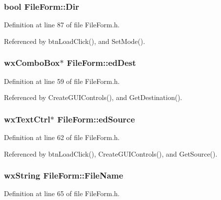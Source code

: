 \subsubsection{\setlength{\rightskip}{0pt plus 5cm}bool {\bf File\-Form::Dir}\hspace{0.3cm}{\tt  [private]}}\label{class_file_form_a6750126e221ecaa6f1b9fc74b459cdb}




Definition at line 87 of file File\-Form.h.

Referenced by btn\-Load\-Click(), and Set\-Mode().
\subsubsection{\setlength{\rightskip}{0pt plus 5cm}wx\-Combo\-Box$\ast$ {\bf File\-Form::ed\-Dest}\hspace{0.3cm}{\tt  [private]}}\label{class_file_form_03a585fd88216540c1c8aa4e760ddf5e}




Definition at line 59 of file File\-Form.h.

Referenced by Create\-GUIControls(), and Get\-Destination().
\subsubsection{\setlength{\rightskip}{0pt plus 5cm}wx\-Text\-Ctrl$\ast$ {\bf File\-Form::ed\-Source}\hspace{0.3cm}{\tt  [private]}}\label{class_file_form_1847b0f9cf06a89ffe4bca44fc438b84}




Definition at line 62 of file File\-Form.h.

Referenced by btn\-Load\-Click(), Create\-GUIControls(), and Get\-Source().
\subsubsection{\setlength{\rightskip}{0pt plus 5cm}wx\-String {\bf File\-Form::File\-Name}\hspace{0.3cm}{\tt  [private]}}\label{class_file_form_543f5751cf42a89a3d5bf7d1f5eb7764}




Definition at line 65 of file File\-Form.h.

